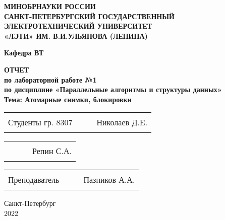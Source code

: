 \begin{titlepage}
\begin{center}
    \uppercase{\textbf{Минобрнауки России\\
            Санкт-Петербургский государственный\\
            электротехнический университет\\
            «ЛЭТИ» им. В.И.Ульянова (Ленина)
    }}
    \vspace{0.25cm}

    \textbf{Кафедра ВТ}
    \vfill

    \uppercase{\textbf{\large{
        Отчет
    }}}
    \\
    \textbf{\large{
      по лабораторной работе №1\\
      по дисциплине «Параллельные алгоритмы и структуры данных»\\
      Тема: Атомарные снимки, блокировки
      \vspace{0.5cm}
    }}
  \bigskip
\end{center}
\vfill
\vfill

\noindent

\begin{tabularx}{\textwidth}{@{}lcXr}
    Студенты гр. 8307 & \hspace{1.6cm} & \rule{5cm}{1pt} & Николаев Д.E.
\end{tabularx}

\begin{tabularx}{\textwidth}{@{}lcXr}
    \phantom{Студенты гр. 8307} & \hspace{1.6cm} & \rule{5cm}{1pt} & Репин С.А.
\end{tabularx}

\vspace{0.5cm}

\noindent
\begin{tabularx}{\textwidth}{@{}lcXr}
    Преподаватель & \hspace{2.3cm} & \rule{5cm}{1pt} & Пазников А.А.
\end{tabularx}

\hfill \break
\hfill \break

\begin{center}
  Санкт-Петербург\\2022
\end{center}

\end{titlepage}

